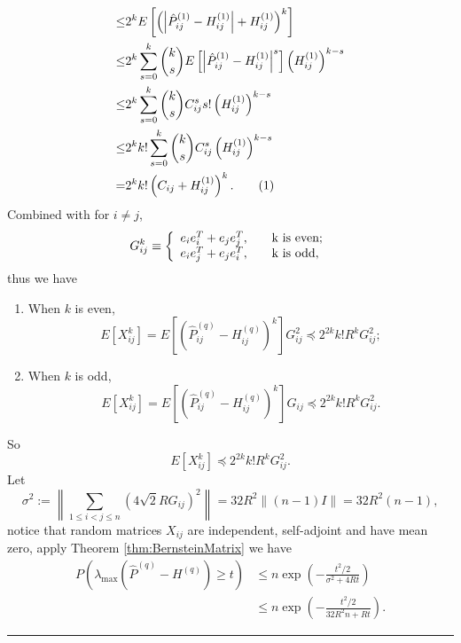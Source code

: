 \documentclass[a4paper]{article}
\newenvironment{proof}{{\bf Proof:  }}{\hfill\rule{2mm}{2mm}}
\begin{document}
\begin{proof}
\begin{align*}
    \le & 2^k E \left[ \left( \left| \hat{P}^{(1)}_{ij} - H^{(1)}_{ij} \right| + H^{(1)}_{ij} \right)^k \right] \\
    \le & 2^k \sum_{s = 0}^k \binom{k}{s} E \left[ \left| \hat{P}^{(1)}_{ij} - H^{(1)}_{ij} \right|^s \right] \left( H^{(1)}_{ij} \right)^{k-s} \\
    \le & 2^k \sum_{s = 0}^k \binom{k}{s} C_{ij}^s s! \left( H^{(1)}_{ij} \right)^{k-s} \\
    \le & 2^k k! \sum_{s = 0}^k \binom{k}{s} C_{ij}^s \left( H^{(1)}_{ij} \right)^{k-s} \\
    = & 2^k k! \left( C_{ij} + H^{(1)}_{ij} \right)^k.
    \stepcounter{equation}\tag{\theequation}\label{eqn:expectpdiffqpowerk}
\end{align*}
Combined with for $i \ne j$,
\[
    G_{ij}^k \equiv \left\{
    \begin{array}{l l}
        e_i e_i^T + e_j e_j^T, \quad & $k$ \text{ is even};\\
        e_i e_j^T + e_j e_i^T, \quad & $k$ \text{ is odd},
    \end{array}
    \right.
\]
thus we have
\begin{enumerate}
\item When $k$ is even,
\[
E[X_{ij}^k] = E[(\hat{P}^{(q)}_{ij} - H^{(q)}_{ij})^k] G_{ij}^2 \preceq 2^{2k} k! R^k G_{ij}^2;
\]
\item When $k$ is odd,
\[
E[X_{ij}^k] = E[(\hat{P}^{(q)}_{ij} - H^{(q)}_{ij})^k] G_{ij} \preceq 2^{2k} k! R^k G_{ij}^2.
\]
\end{enumerate}
So
\[
E[X_{ij}^k] \preceq 2^{2k} k! R^k G_{ij}^2.
\]
Let
\[
	\sigma^2 := \left\| \sum_{1 \le i < j \le n} (4 \sqrt{2} R G_{ij})^2 \right\| = 32 R^2 \| (n-1) I \| = 32 R^2 (n-1),
\]
notice that random matrices $X_{ij}$ are independent, self-adjoint and have mean zero, apply Theorem \ref{thm:BernsteinMatrix} we have
\begin{align*}
	P \left( \lambda_{\max}(\hat{P}^{(q)} - H^{(q)}) \ge t \right) &
    \le n \exp \left( - \frac{t^2/2}{\sigma^2 + 4 R t} \right) \\
    & \le n \exp \left( - \frac{t^2/2}{32 R^2 n + R t} \right).
\end{align*}


\end{proof}
\end{document}
